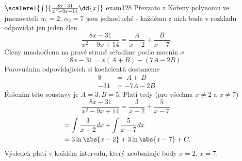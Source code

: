 \begin{mathexam}{\(\scalerel{\int}{\frac{8x-31}{x^2-9x+14}\dd{x}}\) \hfill
  \cite[s.~90]{Knichal}}{exam128} 
  Převzato z \cite[s.~90]{Knichal} Kořeny polynomu ve jmenovateli $\alpha_1 = 2$, $\alpha_2 = 7$
  jsou jednoduché - každému z nich bude v rozkladu odpovídat jen jeden člen
  $$\frac{8x-31}{x^2-9x+14} = \frac{A}{x-2} + \frac{B}{x-7}.$$ Členy mnohočlenu na pravé straně
  seřadíme podle mocnin $x$ $$8x-31 = x(A+B)+(7A-2B).$$ Porovnáním odpovídajících si koeficientů
  dostaneme
  \begin{align*}
    8   &=   \; A + \, B \\
    -31 &= -7A - 2B
  \end{align*}
  Řešením této soustavy je $A = 3, B = 5$. Platí tedy (pro všechna $x \neq 2$ a $x \neq 7$)
  $$\frac{8x-31}{x^2-9x+14} = \frac{3}{x-2} + \frac{5}{x-7}.$$
  \begin{align*}
      &= \int{\frac{3}{x-2}}dx + \int{\frac{5}{x-7}}dx      \\
      &= 3\ln\abs{x-2} + 3\ln\abs{x-7} + C.
  \end{align*}
  Výsledek platí v každém intervalu, který neobsahuje body \(x = 2\), \(x = 7\).
\end{mathexam}
